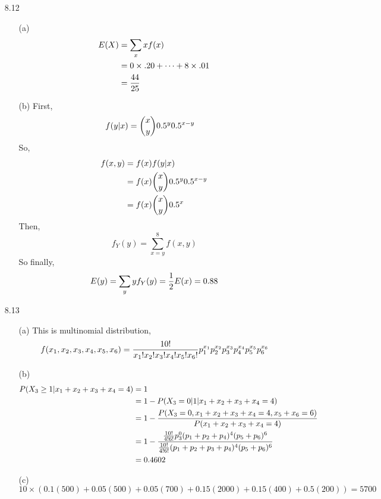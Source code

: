 \documentclass[english, 11pt]{article}
\begin{document}
\begin{itemize}
  \item[8.12]
  \begin{itemize}
    \item[(a)]
    \begin{align*}
      E(X) & = \sum_x xf(x) \\
           & = 0\times.20 + \cdots + 8\times.01 \\
           & = \frac{44}{25}
    \end{align*}
    \item[(b)] First,
    \begin{align*}
      f(y|x) & = {x \choose y} 0.5^{y}0.5^{x-y}
    \end{align*}
    So,
    \begin{align*}
      f(x,y) & = f(x)f(y|x) \\
             & = f(x){x \choose y} 0.5^{y}0.5^{x-y} \\
             & = f(x){x \choose y} 0.5^{x}
    \end{align*}
    Then,
    \[ f_Y(y)  = \sum_{x=y}^8 f(x,y) \]
    So finally,
    \[ E(y) = \sum_y yf_Y(y)= \frac{1}{2} E(x) = 0.88  \]
  \end{itemize}

  \item[8.13]
  \begin{itemize}
    \item[(a)] This is multinomial distribution,
    \[ f(x_1,x_2,x_3,x_4,x_5,x_6) = \frac{10!}{x_1!x_2!x_3!x_4!x_5!x_6!}p_1^{x_1}p_2^{x_2} p_3^{x_3}p_4^{x_4}p_5^{x_5}p_6^{x_6}\]
    \item[(b)]
    \begin{align*}
      P(X_3 \geq 1|x_1 + x_2 + x_3 + x_4 = 4) & = 1 \\
      & = 1 - P(X_3 = 0|1|x_1 + x_2 + x_3 + x_4 = 4) \\
      & = 1 - \frac{P(X_3 = 0, x_1 + x_2 + x_3 + x_4 = 4, x_5 + x_6 = 6)}{P(x_1 + x_2 + x_3 + x_4 = 4)} \\
      & = 1 - \frac{\frac{10!}{4!6!}p_3^0(p_1 + p_2 + p_4)^4(p_5 +p_6)^6}{\frac{10!}{4!6!}(p_1 + p_2 + p_3 + p_4)^4(p_5+p_6)^6} \\
      & = 0.4602
    \end{align*}
    \item[(c)]
    \[ 10 \times (0.1(500) + 0.05(500) + 0.05(700) + 0.15(2000) + 0.15(400) + 0.5(200)) = 5700 \]
  \end{itemize}


\end{itemize}
\end{document}
